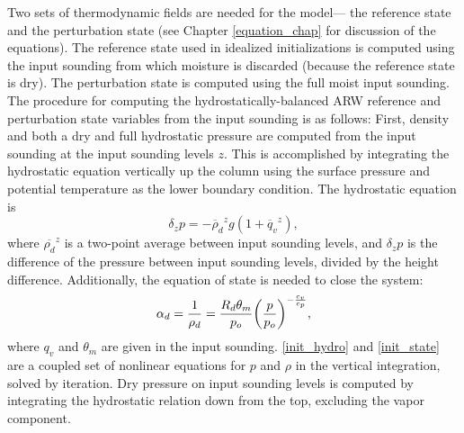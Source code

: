 Two sets of thermodynamic fields are needed for the model--- the
reference state and the perturbation state (see Chapter
\ref{equation_chap} for discussion of the equations).  The
reference state used in idealized initializations is computed using
the input sounding from which moisture is discarded (because the
reference state is dry).  The perturbation state is computed using the full
moist input sounding.  The procedure for computing the hydrostatically-balanced 
ARW reference and perturbation state variables from the input
sounding is as follows: First, density and both a dry and full
hydrostatic pressure are computed from the input sounding at the input
sounding levels $z$.  This is accomplished by integrating the
hydrostatic equation vertically up the column using the surface pressure
and potential temperature as the lower boundary condition.  The
hydrostatic equation is
% 
\begin{equation} \delta_z p = - {\overline
\rho_d}^z g (1 + {\overline q_v}^z), 
\label{init_hydro}
\end{equation} 
% 
\noindent
where $\overline{\rho_d}^z$ is a two-point average between input sounding
levels, and $\delta_z p$ is the difference of the pressure between input
sounding levels, divided by the height difference.  Additionally, the
equation of state is needed to close the system:
% 
\begin{equation} \alpha_d = {1 \over \rho_d} = {R_d
\theta_m \over p_o} 
\biggl({p \over p_o}\biggr)^{-{c_v \over c_p}}, 
\label{init_state}
\end{equation}
%
\noindent
where $q_v$ and $\theta_m$ are given in the input sounding.
\eqref{init_hydro} and \eqref{init_state} are a coupled set of nonlinear
equations for $p$ and $\rho$ in the vertical integration, solved by iteration.  
Dry pressure on input sounding levels is
computed by integrating the hydrostatic relation down from the top,
excluding the vapor component.

